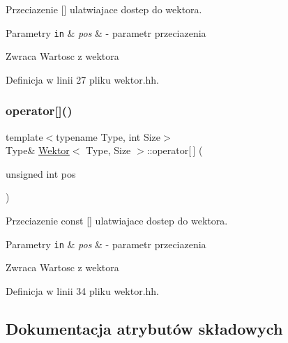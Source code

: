 Przeciazenie \mbox{[}\mbox{]} ulatwiajace dostep do wektora. 


\begin{DoxyParams}[1]{Parametry}
\mbox{\tt in}  & {\em pos} & -\/ parametr przeciazenia \\
\hline
\end{DoxyParams}
\begin{DoxyReturn}{Zwraca}
Wartosc z wektora 
\end{DoxyReturn}


Definicja w linii 27 pliku wektor.\+hh.

\mbox{\label{class_wektor_af2ba6d2ba38150a5e508e2871e18b80d}} 
\subsubsection{\texorpdfstring{operator[]()}{operator[]()}\hspace{0.1cm}{\footnotesize\ttfamily [2/2]}}
{\footnotesize\ttfamily template$<$typename Type, int Size$>$ \\
Type\& \hyperlink{class_wektor}{Wektor}$<$ Type, Size $>$\+::operator\mbox{[}$\,$\mbox{]} (\begin{DoxyParamCaption}\item[{unsigned int}]{pos }\end{DoxyParamCaption})\hspace{0.3cm}{\ttfamily [inline]}}



Przeciazenie const \mbox{[}\mbox{]} ulatwiajace dostep do wektora. 


\begin{DoxyParams}[1]{Parametry}
\mbox{\tt in}  & {\em pos} & -\/ parametr przeciazenia \\
\hline
\end{DoxyParams}
\begin{DoxyReturn}{Zwraca}
Wartosc z wektora 
\end{DoxyReturn}


Definicja w linii 34 pliku wektor.\+hh.



\subsection{Dokumentacja atrybutów składowych}
\mbox{\label{class_wektor_ab2e838853fc88319f5eb21e35490b174}} 

